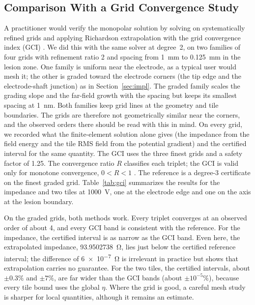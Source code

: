 \documentclass[11pt]{article}
\begin{document}
\subsection{Comparison With a Grid Convergence Study}\label{sec:gci}
A practitioner would verify the monopolar solution by solving on
systematically refined grids and applying Richardson extrapolation with the
grid convergence index (GCI) \cite{roache1998,celik2008}. We did this with the
same solver at degree~2, on two families of four grids with refinement ratio 2
and spacing from \SI{1}{mm} to \SI{0.125}{mm} in the lesion zone. One family is
uniform near the electrode, as a typical user would mesh it; the other is graded
toward the electrode corners (the tip edge and the electrode-shaft junction) as
in Section~\ref{sec:impl}. The graded family scales the grading slope and the
far-field growth with the spacing but keeps its smallest spacing at \SI{1}{nm}.
Both families keep grid lines at the geometry and tile boundaries. The grids are
therefore not geometrically similar near the corners, and the observed orders
there should be read with this in mind. On every grid,
we recorded what the finite-element solution alone gives (the impedance from
the field energy and the tile RMS field from the potential gradient) and the
certified interval for the same quantity. The GCI uses the three finest grids
and a safety factor of 1.25. The convergence ratio $R$ classifies each triplet;
the GCI is valid only for monotone convergence, $0<R<1$ \cite{stern2001}. The
reference is a degree-3 certificate on the finest graded grid.
Table~\ref{tab:gci} summarizes the results for the impedance and two tiles at
\SI{1000}{V}, one at the electrode edge and one on the axis at the lesion boundary.

On the graded grids, both methods work. Every triplet converges at an observed
order of about 4, and every GCI band is consistent with the reference. For the
impedance, the certified interval is as narrow as the GCI band. Even here, the
extrapolated impedance, \SI{93.9502738}{\ohm}, lies just below the certified
reference interval; the difference of \SI{6e-7}{\ohm} is irrelevant
in practice but shows that extrapolation carries no guarantee. For the two
tiles, the certified intervals, about $\pm0.3\%$ and $\pm7\%$, are far wider
than the GCI bands (about $\pm10^{-5}\%$), because every tile bound uses the
global $\eta$. Where the grid is
good, a careful mesh study is sharper for local quantities, although it remains
an estimate.
\end{document}
